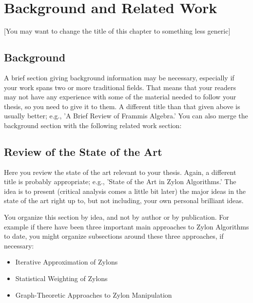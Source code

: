 \chapter{Background and Related Work}\label{basics}
[You may want to change the title of this chapter to something less generic]

\section{Background}

A brief section giving background information may be necessary, especially if your work spans two or more traditional fields. That means that your readers may not have any experience with some of the material needed to follow your thesis, so you need to give it to them. A different title than that given above is usually better; e.g., 'A Brief Review of Frammis Algebra.' You can also merge the background section with the following related work section:

\section{Review of the State of the Art}

Here you review the state of the art relevant to your thesis. Again, a different title is probably appropriate; e.g., 'State of the Art in Zylon Algorithms.' The idea is to present (critical analysis comes a little bit later) the major ideas in the state of the art right up to, but not including, your own personal brilliant ideas.

You organize this section by idea, and not by author or by publication. For example if there have been three important main approaches to Zylon Algorithms to date, you might organize subsections around these three approaches, if necessary:
\begin{itemize}
	\item[3.1] Iterative Approximation of Zylons
	\item[3.2] Statistical Weighting of Zylons
	\item[3.3] Graph-Theoretic Approaches to Zylon Manipulation
\end{itemize}
